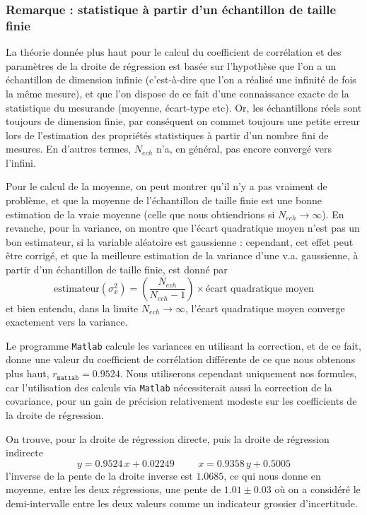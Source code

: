 \subsubsection*{Remarque : statistique à partir d'un échantillon de taille finie}

La théorie donnée plus haut pour le calcul du coefficient de corrélation et des paramètres de la droite de régression est basée sur l'hypothèse que l'on a un échantillon de dimension infinie (c'est-à-dire que l'on a réalisé une infinité de fois la même mesure), et que l'on dispose de ce fait d'une connaissance exacte de la statistique du mesurande (moyenne, écart-type etc). Or, les échantillons réels sont toujours de dimension finie, par conséquent on commet toujours une petite erreur lors de l'estimation des propriétés statistiques à partir d'un nombre fini de mesures. En d'autres termes, $N_{ech}$ n'a, en général, pas encore convergé vers l'infini.

Pour le calcul de la moyenne, on peut montrer qu'il n'y a pas vraiment de problème, et que la moyenne de l'échantillon de taille finie est une bonne estimation de la vraie moyenne (celle que nous obtiendrions si $N_{ech}\rightarrow\infty$). En revanche, pour la variance, on montre que l'écart quadratique moyen n'est pas un bon estimateur, si la variable aléatoire est gaussienne : cependant, cet effet peut être corrigé, et que la meilleure estimation de la variance d'une v.a. gaussienne, à partir d'un échantillon de taille finie, est donné par
$$
\text{estimateur}(\sigma_x^2)=\left(\frac{N_{ech}}{N_{ech}-1}\right)\times\text{écart quadratique moyen}
$$
et bien entendu, dans la limite $N_{ech}\rightarrow\infty$, l'écart quadratique moyen converge exactement vers la variance.

Le programme \texttt{Matlab} calcule les variances en utilisant la correction, et de ce fait, donne une valeur du coefficient de corrélation différente de ce que nous obtenons plus haut, $r_{\texttt{matlab}}=0.9524$. Nous utiliserons cependant uniquement nos formules, car l'utilisation des calculs via \texttt{Matlab} nécessiterait aussi la correction de la covariance, pour un gain de précision relativement modeste sur les coefficients de la droite de régression.

On trouve, pour la droite de régression directe, puis la droite de régression indirecte
$$
y=0.9524\,x+0.02249\hspace{1cm}x=0.9358\,y+0.5005
$$
l'inverse de la pente de la droite inverse est $1.0685$, ce qui nous donne en moyenne, entre les deux régressions, une pente de $1.01\pm0.03$ où on a considéré le demi-intervalle entre les deux valeurs comme un indicateur grossier d'incertitude.

